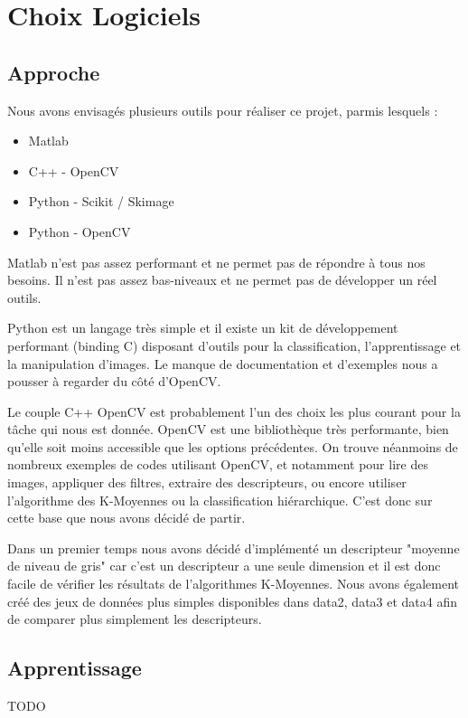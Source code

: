 \documentclass[12pt,a4paper,utf8x]{report}
\begin{document}
\chapter{Choix Logiciels}

\section{Approche}
    Nous avons envisagés plusieurs outils pour réaliser ce projet, parmis lesquels :

    \begin{itemize}
        \item Matlab
        \item C++ - OpenCV
        \item Python - Scikit / Skimage
        \item Python - OpenCV
    \end{itemize}

    Matlab n'est pas assez performant et ne permet pas de répondre à tous nos besoins. Il n'est pas assez bas-niveaux et ne permet pas de développer un réel outils.

    Python est un langage très simple et il existe un kit de développement performant (binding C) disposant d'outils pour la classification, l'apprentissage et la manipulation d'images. Le manque de documentation et d'exemples nous a pousser à regarder du côté d'OpenCV.

    Le couple C++ OpenCV est probablement l'un des choix les plus courant pour la tâche qui nous est donnée. OpenCV est une bibliothèque très performante, bien qu'elle soit moins accessible que les options précédentes. On trouve néanmoins de nombreux exemples de codes utilisant OpenCV, et notamment pour lire des images, appliquer des filtres, extraire des descripteurs, ou encore utiliser l'algorithme des K-Moyennes ou la classification hiérarchique. C'est donc sur cette base que nous avons décidé de partir.

    Dans un premier temps nous avons décidé d'implémenté un descripteur "moyenne de niveau de gris" car c'est un descripteur a une seule dimension et il est donc facile de vérifier les résultats de l'algorithmes K-Moyennes. Nous avons également créé des jeux de données plus simples disponibles dans data2, data3 et data4 afin de comparer plus simplement les descripteurs.


\section{Apprentissage}
    TODO
\end{document}
